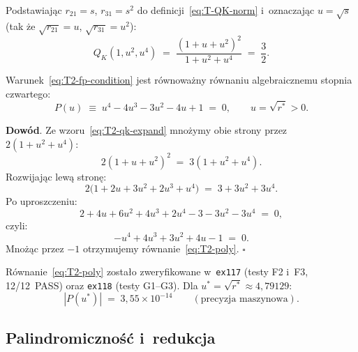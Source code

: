 Podstawiaj\k{a}c $r_{21}=s$, $r_{31}=s^2$ do definicji~\eqref{eq:T-QK-norm}
i~oznaczaj\k{a}c $u = \sqrt{s}$ (tak \.ze $\sqrt{r_{21}}=u$,
$\sqrt{r_{31}}=u^2$):
\begin{equation}\label{eq:T2-qk-expand}
  Q_K(1, u^2, u^4)
    \;=\; \frac{(1 + u + u^2)^2}{1 + u^2 + u^4}
    \;=\; \frac{3}{2}.
\end{equation}

\begin{proposition}\label{prop:T2-poly}
Warunek~\eqref{eq:T2-fp-condition} jest r\'ownowa\.zny r\'ownaniu
algebraicznemu stopnia czwartego:
\begin{equation}\label{eq:T2-poly}
  P(u) \;\equiv\; u^4 - 4u^3 - 3u^2 - 4u + 1 \;=\; 0,
  \qquad u = \sqrt{r^*} > 0.
\end{equation}

\textbf{Dow\'od}.
Ze wzoru~\eqref{eq:T2-qk-expand} mno\.zymy obie strony przez
$2(1+u^2+u^4)$:
\begin{equation}
  2(1+u+u^2)^2 \;=\; 3(1+u^2+u^4).
\end{equation}
Rozwijaj\k{a}c lewą stron\k{e}:
\begin{equation}
  2\bigl(1 + 2u + 3u^2 + 2u^3 + u^4\bigr)
  \;=\; 3 + 3u^2 + 3u^4.
\end{equation}
Po uproszczeniu:
\begin{equation}
  2 + 4u + 6u^2 + 4u^3 + 2u^4
  - 3 - 3u^2 - 3u^4 \;=\; 0,
\end{equation}
czyli:
\begin{equation}
  -u^4 + 4u^3 + 3u^2 + 4u - 1 \;=\; 0.
\end{equation}
Mno\.z\k{a}c przez $-1$ otrzymujemy r\'ownanie~\eqref{eq:T2-poly}.
\hfill$\square$
\end{proposition}

\begin{remark}\label{rem:T2-verify}
R\'ownanie~\eqref{eq:T2-poly} zosta\l{}o zweryfikowane w~\texttt{ex117}
(testy F2 i~F3, 12/12~PASS) oraz \texttt{ex118} (testy G1--G3).
Dla $u^* = \sqrt{r^*} \approx 4{,}79129$:
\[
  |P(u^*)| \;=\; 3{,}55 \times 10^{-14}
  \qquad (\text{precyzja maszynowa}).
\]
\end{remark}


\subsection{Palindromiczno\'s\'c i~redukcja}\label{app:T2-palindrome}

